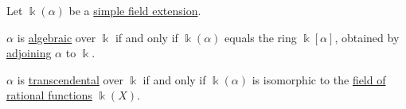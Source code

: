 \begin{proposition}\label{thm:simple_field_extension_characterization}
  Let \( \Bbbk(\alpha) \) be a \hyperref[def:simple_field_extension]{simple field extension}.
  \begin{thmenum}
     \( \alpha \) is \hyperref[def:algebraic_element]{algebraic} over \( \Bbbk \) if and only if \( \Bbbk(\alpha) \) equals the ring \( \Bbbk[\alpha] \), obtained by \hyperref[def:semiring_adjunction]{adjoining} \( \alpha \) to \( \Bbbk \).

     \( \alpha \) is \hyperref[def:transcendental_element]{transcendental} over \( \Bbbk \) if and only if \( \Bbbk(\alpha) \) is isomorphic to the \hyperref[def:rational_function_field]{field of rational functions} \( \Bbbk(X) \).
  \end{thmenum}
\end{proposition}
